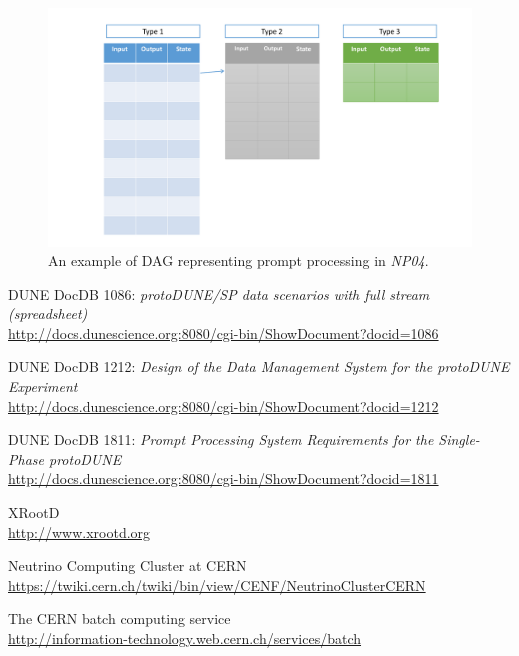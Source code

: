 \documentclass[pdftex,12pt,letter]{article}
\newcommand{\expname}{\textit{NP04}\xspace}
\begin{document}
\begin{figure}[tbh]
  \centering
  \includegraphics[width=1.0\textwidth]{figures/prompt_queues_1.pdf}
  \caption{An example of DAG representing prompt processing in \expname.}
  \label{fig:dag1}
\end{figure}

\begin{thebibliography}{1}
{DUNE DocDB 1086: \textit{ protoDUNE/SP data scenarios with full stream (spreadsheet)}}\\
\url{http://docs.dunescience.org:8080/cgi-bin/ShowDocument?docid=1086}





{DUNE DocDB 1212: \textit{Design of the Data Management System for the protoDUNE Experiment}}\\
\url{http://docs.dunescience.org:8080/cgi-bin/ShowDocument?docid=1212}

{DUNE DocDB 1811: \textit{Prompt Processing System Requirements for the Single-Phase protoDUNE}}\\
\url{http://docs.dunescience.org:8080/cgi-bin/ShowDocument?docid=1811}


{XRootD}\\
\url{http://www.xrootd.org}

{Neutrino Computing Cluster at CERN}\\
\url{https://twiki.cern.ch/twiki/bin/view/CENF/NeutrinoClusterCERN}

{The CERN batch computing service}\\
\url{http://information-technology.web.cern.ch/services/batch}

\end{thebibliography}
\end{document}
